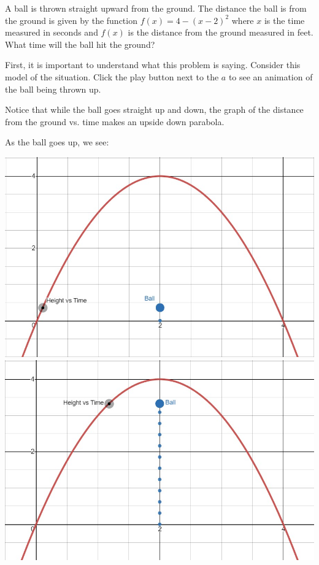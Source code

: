 \documentclass[nooutcomes]{ximera}
\begin{document}
\begin{example}
A ball is thrown straight upward from the ground.  The distance the ball is from the ground is given by the function $f(x)=4-(x-2)^2$ where $x$ is the time measured in seconds and $f(x)$ is the distance from the ground measured in feet.  What time will the ball hit the ground?

\begin{explanation}
First, it is important to understand what this problem is saying.  Consider this model of the situation.  Click the play button next to the $a$ to see an animation of the ball being thrown up.

\begin{center}  
\end{center}

Notice that while the ball goes straight up and down, the graph of the distance from the ground vs. time makes an upside down parabola.  

As the ball goes up, we see:
\begin{image}
\includegraphics{Zeros-BouncingBall1}
\includegraphics{Zeros-BouncingBall3}
\end{image}



\end{explanation}
\end{example}
\end{document}
